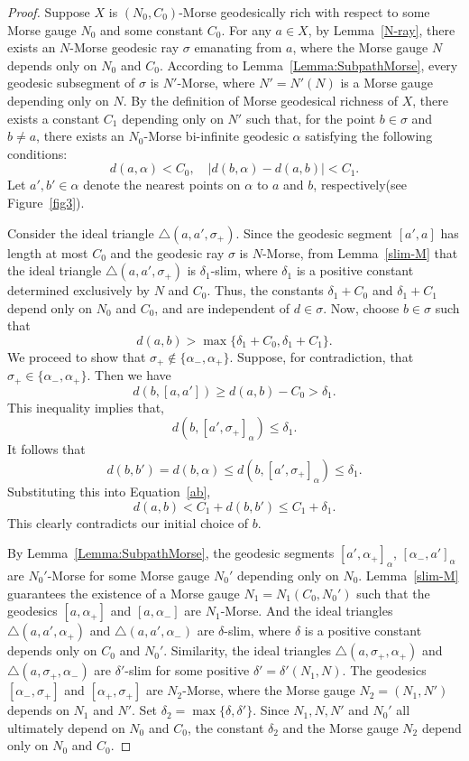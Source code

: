 \documentclass[a4paper,11pt,oneside]{article}
\begin{document}
\begin{proof}
Suppose $X$ is $(N_0, C_0)$-Morse geodesically rich with respect to some Morse gauge $N_0$ and some constant $C_0$.
For any $a\in X$, by Lemma~\ref{N-ray}, there exists an $N$-Morse geodesic ray $\sigma$ emanating from $a$, where the Morse gauge $N$ depends only on $N_0$ and $C_0$. 
According to Lemma~\ref{Lemma:SubpathMorse}, every geodesic subsegment of $\sigma$ is $N'$-Morse, where $N'=N'(N)$ is a Morse gauge depending only on $N$.
By the definition of Morse geodesical richness of $X$, there exists a constant $C_1$ depending only on $N'$ such that, 
for the point $b\in\sigma$ and $b\neq a$,
there exists an $N_0$-Morse bi-infinite geodesic $\alpha$ satisfying the following conditions: 
\begin{equation}\label{ab}
    d(a, \alpha)<C_0,\quad \left|d(b, \alpha)-d(a, b)\right|< C_1.
\end{equation}
Let $a', b'\in \alpha$ denote the nearest points on $\alpha$ to $a$ and $b$, respectively(see Figure~\ref{fig3}).

Consider the ideal triangle $\triangle(a, a', \sigma_+)$. Since the geodesic segment $[a', a]$ has length at most $C_0$ and the geodesic ray $\sigma$ is $N$-Morse, 
from Lemma~\ref{slim-M} that the ideal triangle $\triangle(a,a', \sigma_+)$ is $\delta_1$-slim, where $\delta_1$ is a positive constant determined exclusively by $N$ and $C_0$. Thus, the constants $\delta_1+C_0$ and $\delta_1+C_1$ depend only on $N_0$ and $C_0$, and are independent of $d\in\sigma$.
Now, choose $b\in \sigma$ such that 
\[d(a, b)> \max\{\delta_1+C_0, \delta_1+C_1\}.\]
We proceed to show that $\sigma_+\notin\{\alpha_-, \alpha_+\}$. Suppose, for contradiction, that $\sigma_+\in\{\alpha_-, \alpha_+\}$.
Then we have
\[
d(b, [a, a'])\ge d(a,b)-C_0>\delta_1.
\]
This inequality implies that, 
\[
d(b, [a', \sigma_+]_{\alpha})\le \delta_1.
\]
It follows that
\[
d(b, b')=d(b, \alpha)\le d(b, [a', \sigma_+]_{\alpha})\le \delta_1.
\]
Substituting this into Equation~\eqref{ab}, 
\[
d(a,b)<C_1+d(b, b')\le C_1+\delta_1.
\] This clearly contradicts our initial choice of $b$. 

By Lemma~\ref{Lemma:SubpathMorse}, the geodesic segments $[a', \alpha_+]_\alpha$, $[\alpha_-, a']_{\alpha}$ are $N_0'$-Morse for some Morse gauge $N_0'$ depending only on $N_0$. 
Lemma~\ref{slim-M} guarantees the existence of a Morse gauge $N_1=N_1(C_0, N_0')$ such that the geodesics $[a, \alpha_+]$ and $[a, \alpha_-]$ are $N_1$-Morse. And the ideal triangles $\triangle(a, a', \alpha_+)$ and $\triangle(a, a', \alpha_-)$ are $\delta$-slim, where $\delta$ is a positive constant depends only on $C_0$ and $N_0'$. 
Similarity, the ideal triangles $\triangle(a, \sigma_+,\alpha_+)$ and $\triangle(a, \sigma_+, \alpha_-)$ are $\delta'$-slim for some positive $\delta'=\delta'(N_1, N)$. The geodesics $[\alpha_-, \sigma_+]$ and $[\alpha_+,\sigma_+]$ are $N_2$-Morse, where the Morse gauge $N_2=(N_1, N')$ depends on $N_1$ and $N'$. Set $\delta_2=\max\{\delta, \delta'\}$. Since $N_1, N, N'$ and $N_0'$ all ultimately depend on $N_0$ and $C_0$, the constant $\delta_2$ and the Morse gauge $N_2$ depend only on $N_0$ and $C_0$.


\end{proof}
\end{document}
